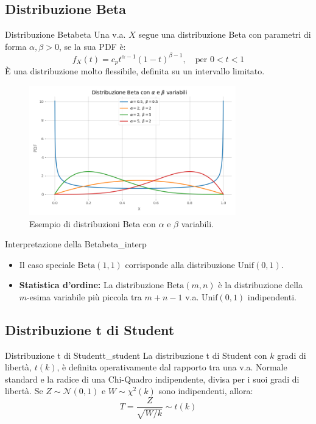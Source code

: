\subsection{Distribuzione Beta}

\begin{definizione}{Distribuzione Beta}{beta}
Una v.a. \(X\) segue una distribuzione Beta con parametri di forma \(\alpha, \beta > 0\), se la sua PDF è:
\[
f_X(t) = c_p t^{\alpha-1}(1-t)^{\beta-1}, \quad \text{per } 0 < t < 1 \text{}
\]
È una distribuzione molto flessibile, definita su un intervallo limitato.
\end{definizione}

\begin{figure}[H]
    \centering
    \includegraphics[width=0.8\textwidth]{images/th_01_03/beta.png}
    \caption{Esempio di distribuzioni Beta con \(\alpha\) e \(\beta\) variabili.}
    \label{fig:beta}
\end{figure}

\begin{nota}{Interpretazione della Beta}{beta_interp}
\begin{itemize}
    \item Il caso speciale \(\text{Beta}(1,1)\) corrisponde alla distribuzione \(\text{Unif}(0,1)\).
    \item \textbf{Statistica d'ordine:} La distribuzione \(\text{Beta}(m,n)\) è la distribuzione della \(m\)-esima variabile più piccola tra \(m+n-1\) v.a. \(\text{Unif}(0,1)\) indipendenti.
\end{itemize}
\end{nota}

\subsection{Distribuzione t di Student}

\begin{definizione}{Distribuzione t di Student}{t_student}
La distribuzione t di Student con \(k\) gradi di libertà, \(t(k)\), è definita operativamente dal rapporto tra una v.a. Normale standard e la radice di una Chi-Quadro indipendente, divisa per i suoi gradi di libertà.
Se \(Z \sim \mathcal{N}(0,1)\) e \(W \sim \chi^2(k)\) sono indipendenti, allora:
\[
T = \frac{Z}{\sqrt{W/k}} \sim t(k) \text{}
\]
\end{definizione}

